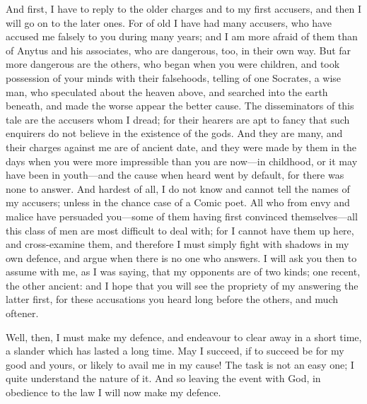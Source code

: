 \documentclass[11pt,letter]{article}
\begin{document}
\par  And first, I have to reply to the older charges and to my first accusers, and then I will go on to the later ones. For of old I have had many accusers, who have accused me falsely to you during many years; and I am more afraid of them than of Anytus and his associates, who are dangerous, too, in their own way. But far more dangerous are the others, who began when you were children, and took possession of your minds with their falsehoods, telling of one Socrates, a wise man, who speculated about the heaven above, and searched into the earth beneath, and made the worse appear the better cause. The disseminators of this tale are the accusers whom I dread; for their hearers are apt to fancy that such enquirers do not believe in the existence of the gods. And they are many, and their charges against me are of ancient date, and they were made by them in the days when you were more impressible than you are now—in childhood, or it may have been in youth—and the cause when heard went by default, for there was none to answer. And hardest of all, I do not know and cannot tell the names of my accusers; unless in the chance case of a Comic poet. All who from envy and malice have persuaded you—some of them having first convinced themselves—all this class of men are most difficult to deal with; for I cannot have them up here, and cross-examine them, and therefore I must simply fight with shadows in my own defence, and argue when there is no one who answers. I will ask you then to assume with me, as I was saying, that my opponents are of two kinds; one recent, the other ancient: and I hope that you will see the propriety of my answering the latter first, for these accusations you heard long before the others, and much oftener.

\par  Well, then, I must make my defence, and endeavour to clear away in a short time, a slander which has lasted a long time. May I succeed, if to succeed be for my good and yours, or likely to avail me in my cause! The task is not an easy one; I quite understand the nature of it. And so leaving the event with God, in obedience to the law I will now make my defence.
\end{document}

